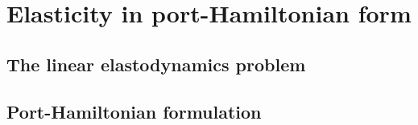 \chapter{Elasticity in port-Hamiltonian form}


\section{The linear elastodynamics problem}


\section{Port-Hamiltonian formulation}


